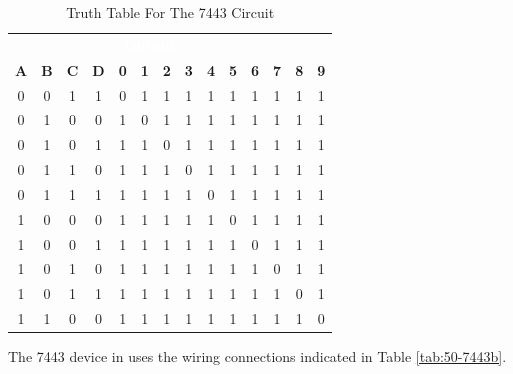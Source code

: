\begin{table}[H]
	\sffamily
	\newcommand{\head}[1]{\textcolor{white}{\textbf{#1}}}		
	\begin{center}
		\begin{tabular}{cccc | cccccccccc} 
			\rowcolor{black!75}
			\multicolumn{4}{c}{\head{Inputs}} & \multicolumn{10}{c}{\head{Output}} \\
			\textbf{A} & \textbf{B} & \textbf{C} & \textbf{D} & \textbf{0} & \textbf{1} & \textbf{2} & \textbf{3} & \textbf{4} & \textbf{5} & \textbf{6} & \textbf{7} & \textbf{8} & \textbf{9} \\
			\hline
			0 & 0 & 1 & 1  & 0 & 1 & 1 & 1 & 1 & 1 & 1 & 1 & 1 & 1 \\
			0 & 1 & 0 & 0  & 1 & 0 & 1 & 1 & 1 & 1 & 1 & 1 & 1 & 1 \\
			0 & 1 & 0 & 1  & 1 & 1 & 0 & 1 & 1 & 1 & 1 & 1 & 1 & 1 \\
			0 & 1 & 1 & 0  & 1 & 1 & 1 & 0 & 1 & 1 & 1 & 1 & 1 & 1 \\
			0 & 1 & 1 & 1  & 1 & 1 & 1 & 1 & 0 & 1 & 1 & 1 & 1 & 1 \\
			1 & 0 & 0 & 0  & 1 & 1 & 1 & 1 & 1 & 0 & 1 & 1 & 1 & 1 \\
			1 & 0 & 0 & 1  & 1 & 1 & 1 & 1 & 1 & 1 & 0 & 1 & 1 & 1 \\
			1 & 0 & 1 & 0  & 1 & 1 & 1 & 1 & 1 & 1 & 1 & 0 & 1 & 1 \\
			1 & 0 & 1 & 1  & 1 & 1 & 1 & 1 & 1 & 1 & 1 & 1 & 0 & 1 \\
			1 & 1 & 0 & 0  & 1 & 1 & 1 & 1 & 1 & 1 & 1 & 1 & 1 & 0 \\
		\end{tabular}
	\end{center}
	\caption{Truth Table For The 7443 Circuit}
	\label{tab:50-7443a}
\end{table}

The 7443 device in \LE uses the wiring connections indicated in Table \ref{tab:50-7443b}.

